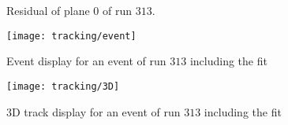 \begin{figure}[ht]
	\centering
	\hfill
	\caption{Residual of plane $0$ of run $313$.}
	\label{pres}
\end{figure}\no
\begin{figure}[ht]
	\centering
	\texttt{[image: tracking/event]}
	\caption{Event display for an event of run $313$ including the fit}
	\label{pevent}
\end{figure}\no
\begin{figure}[ht]
	\centering
	\texttt{[image: tracking/3D]}
	\caption{3D track display for an event of run $313$ including the fit}
	\label{p3D}
\end{figure}\no
